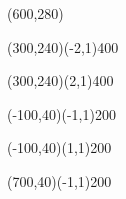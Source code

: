 \documentclass[12pt]{article}
\begin{document}
\begin{figure}[htb]
\hspace*{\fill}
\begin{egame}(600,280)

\renewcommand{\egarrowstyle}{}

\putbranch(300,240)(-2,1){400}

\renewcommand{\egarrowstyle}{}

\putbranch(300,240)(2,1){400}

\renewcommand{\egarrowstyle}{}

\putbranch(-100,40)(-1,1){200}

\renewcommand{\egarrowstyle}{}

\putbranch(-100,40)(1,1){200}

\renewcommand{\egarrowstyle}{}

\putbranch(700,40)(-1,1){200}

\renewcommand{\egarrowstyle}{}


\end{egame}
\end{figure}
\end{document}
